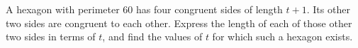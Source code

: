 A hexagon with perimeter $60$ has four congruent sides of length $t+1$. Its other two sides are congruent to each other. Express the length of each of those other two sides in terms of $t$, and find the values of $t$ for which such a hexagon exists.
